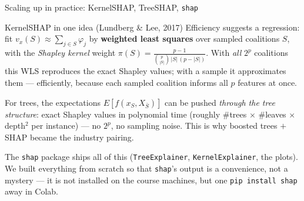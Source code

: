 \documentclass[aspectratio=169,11pt]{beamer}
\begin{document}
\begin{frame}{Scaling up in practice: KernelSHAP, TreeSHAP, \texttt{shap}}
  \footnotesize
  \begin{block}{KernelSHAP in one idea (Lundberg \& Lee, 2017)}
    Efficiency suggests a regression: fit $v_x(S) \approx \sum_{j\in S}\varphi_j$
    by \textbf{weighted least squares} over sampled coalitions $S$, with the
    \emph{Shapley kernel} weight
    $\pi(S) = \frac{p-1}{\binom{p}{|S|}\,|S|\,(p-|S|)}$.
    With \emph{all} $2^p$ coalitions this WLS reproduces the exact Shapley values;
    with a sample it approximates them --- efficiently, because each sampled
    coalition informs all $p$ features at once.
  \end{block}
  \begin{readme}
    For trees, the expectations $E[f(x_S, X_{\bar S})]$ can be pushed \emph{through
    the tree structure}: exact Shapley values in polynomial time (roughly \#trees
    $\times$ \#leaves $\times$ depth$^2$ per instance) --- no $2^p$, no sampling
    noise. This is why boosted trees $+$ SHAP became the industry pairing.
  \end{readme}
  \begin{industry}
    The \texttt{shap} package ships all of this (\texttt{TreeExplainer},
    \texttt{KernelExplainer}, the plots). We built everything from scratch so that
    \texttt{shap}'s output is a convenience, not a mystery --- it is not installed on
    the course machines, but one \texttt{pip install shap} away in Colab.
  \end{industry}
\end{frame}
\end{document}
